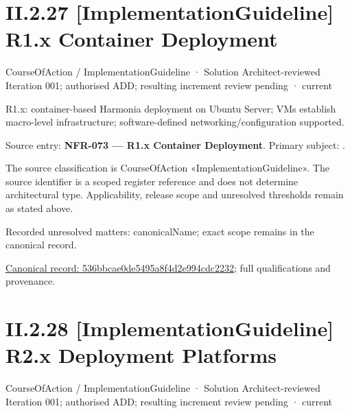 \section*{II.2.27 [ImplementationGuideline] R1.x Container Deployment}
\label{navigation:II.2.27}

\label{element:536bbcae0de5495a8f4d2e994cdc2232}
{\small CourseOfAction / ImplementationGuideline · Solution Architect-reviewed Iteration 001; authorised ADD; resulting increment review pending · current}\par

R1.x: container-based Harmonia deployment on Ubuntu Server; VMs establish macro-level infrastructure; software-defined networking/configuration supported.



Source entry: \textbf{NFR-073 — R1.x Container Deployment}. Primary subject: \texttt{}.



The source classification is CourseOfAction «ImplementationGuideline». The source identifier is a scoped register reference and does not determine architectural type. Applicability, release scope and unresolved thresholds remain as stated above.


{\small Recorded unresolved matters: canonicalName; exact scope remains in the canonical record.}\par
{\footnotesize \href{../../../../../../../continuum/strategy/course-of-action/implementation-guideline/536bbcae0de5495a8f4d2e994cdc2232.md}{Canonical record: 536bbcae0de5495a8f4d2e994cdc2232}; full qualifications and provenance.}\par
\section*{II.2.28 [ImplementationGuideline] R2.x Deployment Platforms}
\label{navigation:II.2.28}

\label{element:e1521c49b740487e935fa9ecd00675a0}
{\small CourseOfAction / ImplementationGuideline · Solution Architect-reviewed Iteration 001; authorised ADD; resulting increment review pending · current}\par

